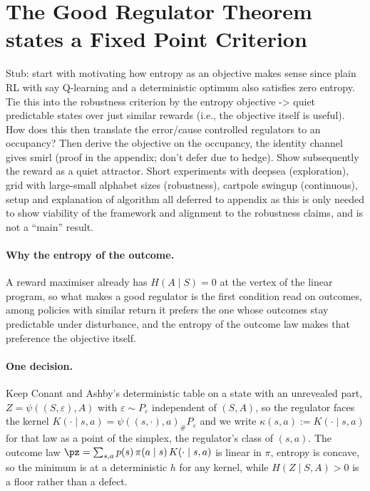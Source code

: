 

\section[The Good Regulator Theorem states a Fixed Point Criterion]{The Good Regulator Theorem states a Fixed Point Criterion }
\label{sec:objective}

Stub: start with motivating how entropy as an objective makes sense since plain RL with say Q-learning and a deterministic optimum also satisfies zero entropy.
Tie this into the robustness criterion by the entropy objective -> quiet predictable states over just similar rewards (i.e., the objective itself is useful).
How does this then translate the error/cause controlled regulators to an occupancy?
Then derive the objective on the occupancy, the identity channel gives smirl (proof in the appendix; don't defer due to hedge).
Show subsequently the reward as a quiet attractor.
Short experiments with deepsea (exploration), grid with large-small alphabet sizes (robustness), cartpole swingup (continuous), setup and explanation of algorithm all deferred to appendix as this is only needed to show viability of the framework and alignment to the robustness claims, and is not a ``main'' result.

\paragraph{Why the entropy of the outcome.}
A reward maximiser already has $H(A \mid S) = 0$ at the vertex of the linear program, so what makes a good regulator is the first condition read on outcomes, among policies with similar return it prefers the one whose outcomes stay predictable under disturbance, and the entropy of the outcome law makes that preference the objective itself.

\paragraph{One decision.}
Keep Conant and Ashby's deterministic table on a state with an unrevealed part, $Z = \psi((S,\varepsilon),A)$ with $\varepsilon \sim P_\varepsilon$ independent of $(S,A)$, so the regulator faces the kernel $K(\cdot \mid s,a) = \psi((s,\cdot),a)_{\#} P_\varepsilon$ and we write $\kappa(s,a) := K(\cdot \mid s,a)$ for that law as a point of the simplex, the regulator's class of $(s,a)$.
The outcome law $\pz = \sum_{s,a} p(s)\, \pi(a \mid s)\, K(\cdot \mid s,a)$ is linear in $\pi$, entropy is concave, so the minimum is at a deterministic $h$ for any kernel, while $H(Z \mid S,A) > 0$ is a floor rather than a defect.

